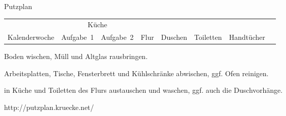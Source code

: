 \documentclass[landscape]{slides}
\begin{document}
\newcommand{\seite}{R}

\begin{slide}
\begin{center}
\Large Putzplan
\end{center}

\begin{small}
\begin{tabular}{rrrccccccc}
    \toprule
    & & & \multicolumn{2}{c}{Küche} \\ \cmidrule{4-5}
    \multicolumn{3}{c}{Kalenderwoche} & Aufgabe~1 & Aufgabe~2 & Flur & Duschen & Toiletten & Handtücher \\ \midrule

    

    \bottomrule
\end{tabular}
\end{small}

\begin{tiny}
\begin{description}
    \setlength{\itemsep}{0pt}
    \item[Aufgabe~1] Boden wischen, Müll und Altglas rausbringen.
    \item[Aufgabe~2] Arbeitsplatten, Tische, Fensterbrett und Kühlschränke abwischen, ggf. Ofen reinigen.
    \item[Handtücher] in Küche und Toiletten des Flurs austauschen und waschen, ggf. auch die Duschvorhänge.
\end{description}
\vspace{-1em}
\hfill http://putzplan.kruecke.net/
\end{tiny}
\end{slide}

\renewcommand{\seite}{S}
\end{document}
